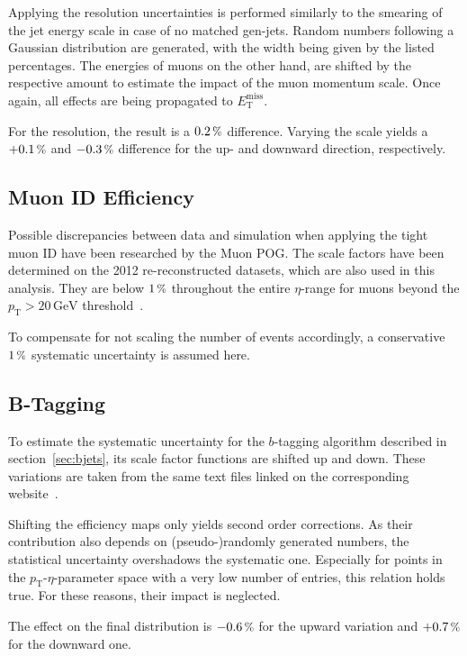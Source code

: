 Applying the resolution uncertainties is performed similarly to the smearing of the jet energy scale in case of no matched gen-jets. Random numbers following a Gaussian distribution are generated, with the width being given by the listed percentages. The energies of muons on the other hand, are shifted by the respective amount to estimate the impact of the muon momentum scale. Once again, all effects are being propagated to $E_{\text{T}}^{\text{miss}}$.

For the resolution, the result is a $0.2\,\pct$ difference. Varying the scale yields a $+0.1\,\pct$ and $-0.3\,\pct$ difference for the up- and downward direction, respectively.


\subsection{Muon  ID Efficiency}
\label{sec:muonidsys}

Possible discrepancies between data and simulation when applying the tight muon ID have been researched by the Muon POG. The scale factors have been determined on the 2012 re-reconstructed datasets, which are also used in this analysis. They are below $1\,\pct$ throughout the entire $\eta$-range for muons beyond the $p_{\text{T}} > 20\,\text{GeV}$ threshold~\cite{muonideff}. 

To compensate for not scaling the number of events accordingly, a conservative $1\,\pct$ systematic uncertainty is assumed here.


\subsection{B-Tagging}
\label{sec:btagsys}

To estimate the systematic uncertainty for the $b$-tagging algorithm described in section~\ref{sec:bjets}, its scale factor functions are shifted up and down. These variations are taken from the same text files linked on the corresponding website~\cite{btagtwiki}.

Shifting the efficiency maps only yields second order corrections. As their contribution also depends on (pseudo-)randomly generated numbers, the statistical uncertainty overshadows the systematic one. Especially for points in the $p_{\text{T}}$-$\eta$-parameter space with a very low number of entries, this relation holds true. For these reasons, their impact is neglected.

The effect on the final distribution is $-0.6\,\pct$ for the upward variation and $+0.7\,\pct$ for the downward one.



